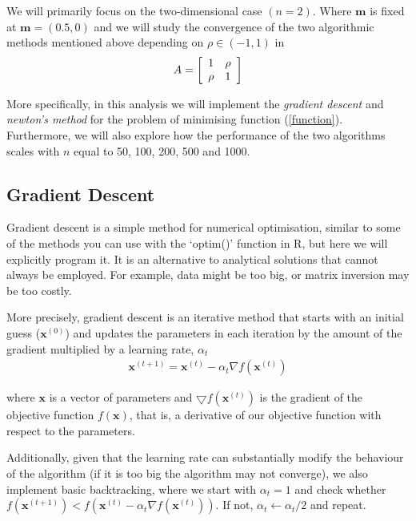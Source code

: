 \documentclass[12pt, authoryear]{elsarticle}
\begin{document}
We will primarily focus on the two-dimensional case $(n = 2)$. Where $\boldsymbol{m}$ is fixed at $\boldsymbol{m} = (0.5, 0)$ and we will study the convergence of the two algorithmic methods mentioned above depending on $\rho \in ( - 1,1 )$ in
\[
A = \left[ \begin{array} { l l } { 1 } & { \rho } \\ { \rho } & { 1 } \end{array} \right]
\]

More specifically, in this analysis we will implement the \textit{gradient descent} and \textit{newton's method} for the problem of minimising function (\ref{function}).  Furthermore, we will also explore how the performance of the two algorithms scales with $n$ equal to 50, 100, 200, 500 and 1000.

\subsection{Gradient Descent}

Gradient descent is a simple method for numerical optimisation, similar to some of the methods you can use with the `optim()' function in R, but here we will explicitly program it. It is an alternative to analytical solutions that cannot always be employed. For example, data might be too big, or matrix inversion may be too costly.

More precisely, gradient descent is an iterative method that starts with an initial guess ($\boldsymbol{x} ^ { ( 0) }$) and updates the parameters in each iteration by the amount of the gradient multiplied by a learning rate, $\alpha_t$
\begin{equation}
\begin{aligned}
\boldsymbol{x} ^ { ( t + 1 ) } = \boldsymbol{x} ^ { ( t ) } - \alpha_{ t } \nabla f \left( \boldsymbol{x} ^ { ( t ) } \right)
\label{gd_update}
\end{aligned}
\end{equation}

where $\boldsymbol{x}$ is a vector of parameters and $\bigtriangledown f(\boldsymbol{x}^ { ( t ) })$ is the gradient of the objective function $f(\boldsymbol{x})$, that is, a derivative of our objective function with respect to the parameters.  
 
Additionally, given that the learning rate can substantially modify the behaviour of the algorithm (if it is too big the algorithm may not converge), we also implement basic backtracking, where we start with $\alpha_t = 1$ and check whether $ f \left( \boldsymbol{x} ^ { ( t + 1 )} \right) <  f \left(   \boldsymbol{x} ^ { ( t ) } - \alpha_{ t } \nabla f \left( \boldsymbol{x} ^ { ( t ) } \right) \right)  $. If not, $\alpha_t \leftarrow \alpha_t/ 2$ and repeat.
\end{document}
